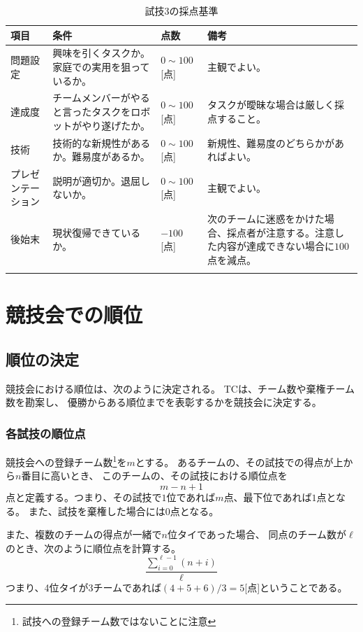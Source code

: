 \documentclass[a4j]{jarticle}
\def\thline{\noalign{\hrule height 1pt}}
\begin{document}
\begin{table}
\begin{center}
\caption{試技3の採点基準}
\label{table:test3score}
\begin{tabular}{l|p{4cm}|l|p{4cm}}
\thline
項目 & 条件 & 点数 & 備考\\
\hline
問題設定 & 興味を引くタスクか。家庭での実用を狙っているか。 & $0\sim100$[点] & 主観でよい。\\
達成度 & チームメンバーがやると言ったタスクをロボットがやり遂げたか。 & $0\sim100$[点] & タスクが曖昧な場合は厳しく採点すること。 \\
技術 & 技術的な新規性があるか。難易度があるか。 & $0\sim100$[点]  & 新規性、難易度のどちらかがあればよい。\\
プレゼンテーション & 説明が適切か。退屈しないか。 & $0\sim100$[点] & 主観でよい。\\
後始末 & 現状復帰できているか。 & $-100$[点] & 次のチームに迷惑をかけた場合、採点者が注意する。注意した内容が達成できない場合に$100$点を減点。\\
\thline
\end{tabular}
\end{center}
\end{table}



\section{競技会での順位}

\subsection{順位の決定}

競技会における順位は、次のように決定される。
TCは、チーム数や棄権チーム数を勘案し、
優勝からある順位までを表彰するかを競技会に決定する。

\subsubsection{各試技の順位点}

競技会への登録チーム数\footnote{試技への登録チーム数ではないことに注意}を$m$とする。
あるチームの、その試技での得点が上から$n$番目に高いとき、
このチームの、その試技における順位点を
\[
	m - n + 1
\]
点と定義する。つまり、その試技で$1$位であれば$m$点、最下位であれば$1$点となる。
また、試技を棄権した場合には$0$点となる。

また、複数のチームの得点が一緒で$n$位タイであった場合、
同点のチーム数が$\ell$のとき、次のように順位点を計算する。
\[
	\dfrac{\sum_{i=0}^{\ell-1}(n + i)}{\ell}
\]
つまり、4位タイが3チームであれば$(4+5+6)/3=5$[点]ということである。
\end{document}
